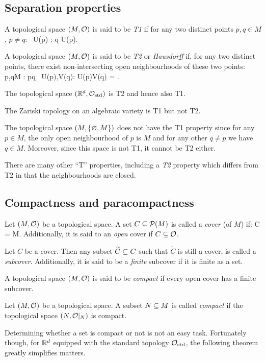\subsection{Separation properties}

\bd
A topological space $(M,\mathcal{O})$ is said to be \emph{T1} if for any two distinct points $p,q\in M$, $p\neq q$:
\bse
\exists \, U(p) \in \cO : q \notin U(p).
\ese
\ed

\bd
A topological space $(M,\mathcal{O})$ is said to be \emph{T2} or \emph{Hausdorff} if, for any two distinct points, there exist non-intersecting open neighbourhoods of these two points:
\bse
\forall \, p,q\in M : p\neq q \imp \exists \, U(p),V(q)\in \cO : U(p)\cap V(q) = \vn.
\ese
\ed

\be
The topological space $(\mathbb{R}^d,\mathcal{O}_\mathrm{std})$ is T2 and hence also T1.
\ee

\be
The Zariski topology on an algebraic variety is T1 but not T2.
\ee

\be
The topological space $(M,\{\varnothing,M\})$ does not have the T1 property since for any $p \in M$, the only open neighbourhood of $p$ is $M$ and for any other $q\neq p$ we have $q\in M$. Moreover, since this space is not T1, it cannot be T2 either.
\ee

\br
There are many other ``T'' properties, including a \emph{T2} property which differs from T2 in that the neighbourhoods are closed.
\er

\subsection{Compactness and paracompactness}

\bd
Let $(M,\mathcal{O})$ be a topological space. A set $C \subseteq \mathcal{P}(M)$ is called a \emph{cover} (of $M$) if:
\bse
\bigcup C = M.
\ese
Additionally, it is said to an \emph{open} cover if $C \subseteq \mathcal{O}$.
\ed

\bd
Let $C$ be a cover. Then any subset $\widetilde{C}\subseteq C$ such that $\widetilde{C}$ is still a cover, is called a \emph{subcover}. Additionally, it is said to be a \emph{finite} subcover if it is finite as a set.
\ed

\bd
A topological space $(M,\mathcal{O})$ is said to be \emph{compact} if every open cover has a finite subcover.
\ed

\bd
Let $(M,\mathcal{O})$ be a topological space. A subset $N\subseteq M$ is called \emph{compact} if the topological space $(N,\mathcal{O}|_N)$ is compact.
\ed

Determining whether a set is compact or not is not an easy task. Fortunately though, for $\mathbb{R}^d$ equipped with the standard topology $\mathcal{O}_\mathrm{std}$, the following theorem greatly simplifies matters.

